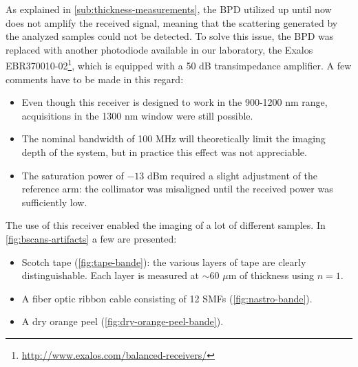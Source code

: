 As explained in \autoref{sub:thickness-measurements}, the BPD utilized up until now does not amplify the received signal, meaning that the scattering generated by the analyzed samples could not be detected. To solve this issue, the BPD was replaced with another photodiode available in our laboratory, the Exalos EBR370010-02\footnote{\url{http://www.exalos.com/balanced-receivers/}}, which is equipped with a 50 dB transimpedance amplifier. A few comments have to be made in this regard:
\begin{itemize}
	\item Even though this receiver is designed to work in the 900-1200 nm range, acquisitions in the 1300 nm window were still possible. 
	
	\item The nominal bandwidth of 100 MHz will theoretically limit the imaging depth of the system, but in practice this effect was not appreciable. 
	
	\item The saturation power of $-13$ dBm required a slight adjustment of the reference arm: the collimator was misaligned until the received power was sufficiently low. 
\end{itemize}

The use of this receiver enabled the imaging of a lot of different samples. In \autoref{fig:bscans-artifacts} a few are presented:
\begin{itemize}
	\item Scotch tape (\autoref{fig:tape-bande}): the various layers of tape are clearly distinguishable. Each layer is measured at $\sim 60$ $\mu$m of thickness using $n=1$. 
		\item A fiber optic ribbon cable consisting of 12 \acp{SMF} (\autoref{fig:nastro-bande}).
		
	\item A dry orange peel (\autoref{fig:dry-orange-peel-bande}). 
	
	
\end{itemize} 

